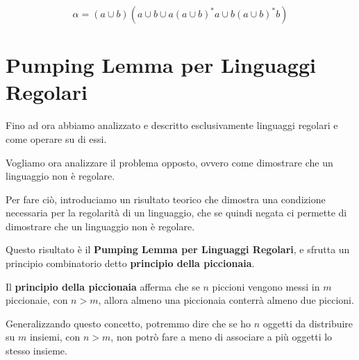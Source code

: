 \begin{equation}
  \alpha = (a \cup b ) (a \cup b \cup a{(a\cup b)}^*a \cup b{(a\cup b)}^*b)
\end{equation}

\newpage

\section{Pumping Lemma per Linguaggi Regolari}

Fino ad ora abbiamo analizzato e descritto esclusivamente linguaggi regolari e come operare su di essi.

Vogliamo ora analizzare il problema opposto, ovvero come dimostrare che un linguaggio non è regolare.

Per fare ciò, introduciamo un risultato teorico che dimostra una condizione necessaria per la regolarità di un linguaggio, che se quindi negata ci permette di dimostrare che un linguaggio non è regolare.

Questo risultato è il \textbf{Pumping Lemma per Linguaggi Regolari}, e sfrutta un principio combinatorio detto \textbf{principio della piccionaia}.

Il \textbf{principio della piccionaia} afferma che se \(n\) piccioni vengono messi in \(m\) piccionaie, con \(n>m\), allora almeno una piccionaia conterrà almeno due piccioni.

Generalizzando questo concetto, potremmo dire che se ho \(n\) oggetti da distribuire su \(m\) insiemi, con \(n>m\), non potrò fare a meno di associare a più oggetti lo stesso insieme.

